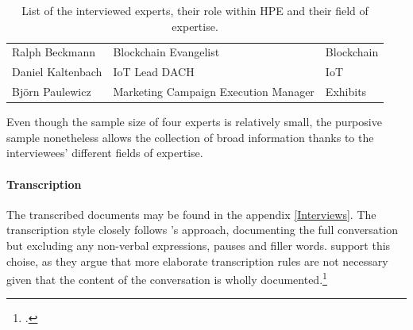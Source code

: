\begin{table}[]  
    \centering
    \begin{tabular}{l|l|l}
        Ralph Beckmann & Blockchain Evangelist & Blockchain \\
        Daniel Kaltenbach & IoT Lead DACH & IoT \\
        Björn Paulewicz & Marketing Campaign Execution Manager & Exhibits \\
    \end{tabular}
    \caption{List of the interviewed experts, their role within HPE and their field of expertise.}
    \label{tab:Experts}
\end{table}

Even though the sample size of four experts is relatively small, the purposive sample nonetheless allows the collection of broad information thanks to the interviewees' different fields of expertise. 

\paragraph{Transcription} The transcribed documents may be found in the appendix \ref{Interviews}. The transcription style closely follows \cite{KrugerqualitativeInhaltsanalyseMethode2004}'s approach, documenting the full conversation but excluding any non-verbal expressions, pauses and filler words. \cite{MeuserExpertInneninterviewsvielfacherprobt1991} support this choise, as they argue that more elaborate transcription rules are not necessary given that the content of the conversation is wholly documented.\footcite[Cf.][p.456]{MeuserExpertInneninterviewsvielfacherprobt1991}

